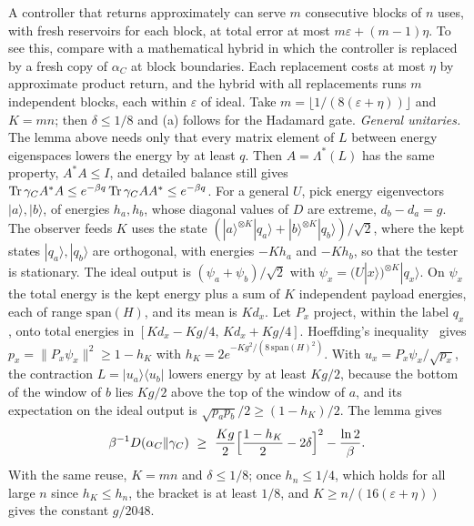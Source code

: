 A controller that returns approximately can serve $m$ consecutive blocks of $n$ uses, with fresh reservoirs for each block, at total error at most $m\varepsilon+(m-1)\eta$. To see this, compare with a mathematical hybrid in which the controller is replaced by a fresh copy of $\alpha_C$ at block boundaries. Each replacement costs at most $\eta$ by approximate product return, and the hybrid with all replacements runs $m$ independent blocks, each within $\varepsilon$ of ideal. Take $m=\lfloor1/(8(\varepsilon+\eta))\rfloor$ and $K=mn$; then $\delta\le1/8$ and (a) follows for the Hadamard gate. \emph{General unitaries.} The lemma above needs only that every matrix element of $L$ between energy eigenspaces lowers the energy by at least $q$. Then $A=\Lambda^*(L)$ has the same property, $A^*A\le I$, and detailed balance still gives $\operatorname{Tr}\gamma_CA^*A\le e^{-\beta q}\operatorname{Tr}\gamma_CAA^*\le e^{-\beta q}$. For a general $U$, pick energy eigenvectors $|a\rangle,|b\rangle$, of energies $h_a,h_b$, whose diagonal values of $D$ are extreme, $d_b-d_a=g$. The observer feeds $K$ uses the state $(|a\rangle^{\otimes K}|q_a\rangle+|b\rangle^{\otimes K}|q_b\rangle)/\sqrt2$, where the kept states $|q_a\rangle,|q_b\rangle$ are orthogonal, with energies $-Kh_a$ and $-Kh_b$, so that the tester is stationary. The ideal output is $(\psi_a+\psi_b)/\sqrt2$ with $\psi_x=(U|x\rangle)^{\otimes K}|q_x\rangle$. On $\psi_x$ the total energy is the kept energy plus a sum of $K$ independent payload energies, each of range $\mathrm{span}(H)$, and its mean is $Kd_x$. Let $P_x$ project, within the label $q_x$, onto total energies in $[Kd_x-Kg/4,\,Kd_x+Kg/4]$. Hoeffding's inequality~\cite{Hoeffding63} gives $p_x=\|P_x\psi_x\|^2\ge1-h_K$ with $h_K=2e^{-Kg^2/(8\,\mathrm{span}(H)^2)}$. With $u_x=P_x\psi_x/\sqrt{p_x}$, the contraction $L=|u_a\rangle\langle u_b|$ lowers energy by at least $Kg/2$, because the bottom of the window of $b$ lies $Kg/2$ above the top of the window of $a$, and its expectation on the ideal output is $\sqrt{p_ap_b}/2\ge(1-h_K)/2$. The lemma gives
\[
\beta^{-1}D(\alpha_C\|\gamma_C)\ \ge\ \frac{Kg}2\Bigl[\frac{1-h_K}2-2\delta\Bigr]^2-\frac{\ln2}\beta .
\]
With the same reuse, $K=mn$ and $\delta\le1/8$; once $h_n\le1/4$, which holds for all large $n$ since $h_K\le h_n$, the bracket is at least $1/8$, and $K\ge n/(16(\varepsilon+\eta))$ gives the constant $g/2048$.

